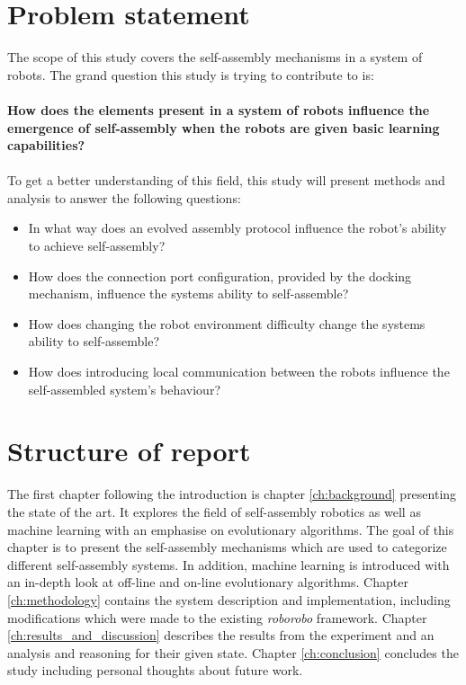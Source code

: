 \section{Problem statement}
The scope of this study covers the self-assembly mechanisms in a system of robots. 
The grand question this study is trying to contribute to is:\\ \\
\textbf{How does the elements present in a system of robots influence the emergence of self-assembly when the robots are given basic learning capabilities?\\ \\}
To get a better understanding of this field, this study will present methods and analysis to answer the following questions:

\begin{itemize}

\item In what way does an evolved assembly protocol influence the robot’s ability to achieve self-assembly?

\item How does the connection port configuration, provided by the docking mechanism, influence the systems ability to self-assemble?

\item How does changing the robot environment difficulty change the systems ability to self-assemble?

\item How does introducing local communication between the robots influence the self-assembled system's behaviour?

\end{itemize}

\section{Structure of report}
The first chapter following the introduction is chapter \ref{ch:background} presenting the state of the art. It explores the field of self-assembly robotics as well as machine learning with an emphasise on evolutionary algorithms. The goal of this chapter is to present the self-assembly mechanisms which are used to categorize different self-assembly systems. In addition, machine learning is introduced with an in-depth look at off-line and on-line evolutionary algorithms. Chapter \ref{ch:methodology} contains the system description and implementation, including modifications which were made to the existing \emph{roborobo} framework. Chapter \ref{ch:results_and_discussion} describes the results from the experiment and an analysis and reasoning for their given state.
Chapter \ref{ch:conclusion} concludes the study including personal thoughts about future work.

